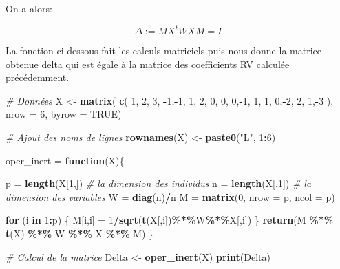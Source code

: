 \documentclass[
]{article}
\newenvironment{Shaded}{\begin{snugshade}}{\end{snugshade}}
\newcommand{\AttributeTok}[1]{\textcolor[rgb]{0.13,0.29,0.53}{#1}}
\newcommand{\CommentTok}[1]{\textcolor[rgb]{0.56,0.35,0.01}{\textit{#1}}}
\newcommand{\ConstantTok}[1]{\textcolor[rgb]{0.56,0.35,0.01}{#1}}
\newcommand{\ControlFlowTok}[1]{\textcolor[rgb]{0.13,0.29,0.53}{\textbf{#1}}}
\newcommand{\DecValTok}[1]{\textcolor[rgb]{0.00,0.00,0.81}{#1}}
\newcommand{\FunctionTok}[1]{\textcolor[rgb]{0.13,0.29,0.53}{\textbf{#1}}}
\newcommand{\NormalTok}[1]{#1}
\newcommand{\OtherTok}[1]{\textcolor[rgb]{0.56,0.35,0.01}{#1}}
\newcommand{\SpecialCharTok}[1]{\textcolor[rgb]{0.81,0.36,0.00}{\textbf{#1}}}
\newcommand{\StringTok}[1]{\textcolor[rgb]{0.31,0.60,0.02}{#1}}
\begin{document}
On a alors:

\[\Delta := M X^t W X  M = \Gamma \]

La fonction ci-dessous fait les calculs matriciels puis nous donne la
matrice obtenue delta qui est égale à la matrice des coefficients RV
calculée précédemment.

\begin{Shaded}
\begin{Highlighting}[]
\CommentTok{\# Données}
\NormalTok{X }\OtherTok{\textless{}{-}} \FunctionTok{matrix}\NormalTok{(}
  \FunctionTok{c}\NormalTok{( }\DecValTok{1}\NormalTok{, }\DecValTok{2}\NormalTok{, }\DecValTok{3}\NormalTok{,}
    \SpecialCharTok{{-}}\DecValTok{1}\NormalTok{,}\SpecialCharTok{{-}}\DecValTok{1}\NormalTok{, }\DecValTok{1}\NormalTok{,}
     \DecValTok{2}\NormalTok{, }\DecValTok{0}\NormalTok{, }\DecValTok{0}\NormalTok{,}
     \DecValTok{0}\NormalTok{,}\SpecialCharTok{{-}}\DecValTok{1}\NormalTok{, }\DecValTok{1}\NormalTok{,}
     \DecValTok{1}\NormalTok{, }\DecValTok{0}\NormalTok{,}\SpecialCharTok{{-}}\DecValTok{2}\NormalTok{,}
     \DecValTok{2}\NormalTok{, }\DecValTok{1}\NormalTok{,}\SpecialCharTok{{-}}\DecValTok{3}
\NormalTok{  ), }\AttributeTok{nrow =} \DecValTok{6}\NormalTok{, }\AttributeTok{byrow =} \ConstantTok{TRUE}\NormalTok{)}

\CommentTok{\# Ajout des noms de lignes}
\FunctionTok{rownames}\NormalTok{(X) }\OtherTok{\textless{}{-}} \FunctionTok{paste0}\NormalTok{(}\StringTok{"L"}\NormalTok{, }\DecValTok{1}\SpecialCharTok{:}\DecValTok{6}\NormalTok{)}

\NormalTok{oper\_inert }\OtherTok{=} \ControlFlowTok{function}\NormalTok{(X)\{}
  
\NormalTok{  p }\OtherTok{=} \FunctionTok{length}\NormalTok{(X[}\DecValTok{1}\NormalTok{,]) }\CommentTok{\# la dimension des individus}
\NormalTok{  n }\OtherTok{=} \FunctionTok{length}\NormalTok{(X[,}\DecValTok{1}\NormalTok{]) }\CommentTok{\# la dimension des variables}
\NormalTok{  W }\OtherTok{=} \FunctionTok{diag}\NormalTok{(n)}\SpecialCharTok{/}\NormalTok{n}
\NormalTok{  M }\OtherTok{=} \FunctionTok{matrix}\NormalTok{(}\DecValTok{0}\NormalTok{, }\AttributeTok{nrow =}\NormalTok{ p, }\AttributeTok{ncol =}\NormalTok{ p)}
  
  \ControlFlowTok{for}\NormalTok{ (i }\ControlFlowTok{in} \DecValTok{1}\SpecialCharTok{:}\NormalTok{p) \{}
\NormalTok{    M[i,i] }\OtherTok{=} \DecValTok{1}\SpecialCharTok{/}\FunctionTok{sqrt}\NormalTok{(}\FunctionTok{t}\NormalTok{(X[,i])}\SpecialCharTok{\%*\%}\NormalTok{W}\SpecialCharTok{\%*\%}\NormalTok{X[,i])}
\NormalTok{  \}}
  \FunctionTok{return}\NormalTok{(M }\SpecialCharTok{\%*\%} \FunctionTok{t}\NormalTok{(X) }\SpecialCharTok{\%*\%}\NormalTok{ W }\SpecialCharTok{\%*\%}\NormalTok{ X }\SpecialCharTok{\%*\%}\NormalTok{ M)}
\NormalTok{\}}

\CommentTok{\# Calcul de la matrice}
\NormalTok{Delta }\OtherTok{\textless{}{-}} \FunctionTok{oper\_inert}\NormalTok{(X)}
\FunctionTok{print}\NormalTok{(Delta)}
\end{Highlighting}
\end{Shaded}
\end{document}
